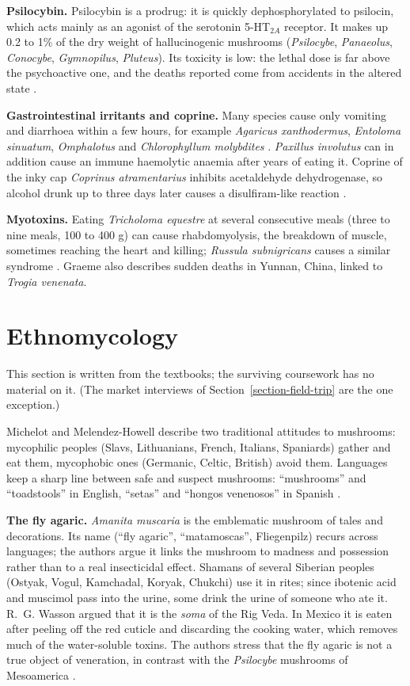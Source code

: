 \textbf{Psilocybin.}
Psilocybin is a prodrug: it is quickly
dephosphorylated to psilocin, which acts
mainly as an agonist of the serotonin
5-HT$_{2A}$ receptor. It makes
up 0.2 to 1\% of the dry weight of
hallucinogenic mushrooms (\emph{Psilocybe},
\emph{Panaeolus}, \emph{Conocybe},
\emph{Gymnopilus}, \emph{Pluteus}). Its
toxicity is low: the lethal dose is far above
the psychoactive one, and the deaths reported
come from accidents in the altered state
\cite{tyls2014psilocybin}.

\textbf{Gastrointestinal irritants and
coprine.}
Many species cause only vomiting and
diarrhoea within a few hours, for example
\emph{Agaricus xanthodermus}, \emph{Entoloma
sinuatum}, \emph{Omphalotus} and
\emph{Chlorophyllum molybdites}
\cite[pp.~110--113]{hall2003edible}.
\emph{Paxillus involutus} can in addition
cause an immune haemolytic anaemia after
years of eating it. Coprine of the inky cap
\emph{Coprinus atramentarius} inhibits
acetaldehyde dehydrogenase, so alcohol drunk
up to three days later causes a
disulfiram-like reaction
\cite{graeme2014mycetism}.

\textbf{Myotoxins.}
Eating \emph{Tricholoma equestre} at several
consecutive meals (three to nine meals, 100
to 400 g) can cause rhabdomyolysis, the
breakdown of muscle, sometimes reaching the
heart and killing; \emph{Russula
subnigricans} causes a similar syndrome
\cite{graeme2014mycetism}. Graeme also
describes sudden deaths in Yunnan, China,
linked to \emph{Trogia venenata}.

\section{Ethnomycology}
\label{section-ethnomycology}

This section is written from the textbooks;
the surviving coursework has no material on
it. (The market interviews of
Section~\ref{section-field-trip} are the one
exception.)

Michelot and Melendez-Howell describe two
traditional attitudes to mushrooms:
mycophilic peoples (Slavs, Lithuanians,
French, Italians, Spaniards) gather and eat
them, mycophobic ones (Germanic, Celtic,
British) avoid them. Languages keep a sharp
line between safe and suspect mushrooms:
``mushrooms'' and ``toadstools'' in English,
``setas'' and ``hongos venenosos'' in Spanish
\cite{michelot2003amanita}.

\textbf{The fly agaric.}
\emph{Amanita muscaria} is the emblematic
mushroom of tales and decorations. Its name
(``fly agaric'', ``matamoscas'', Fliegenpilz)
recurs across languages; the authors argue it
links the mushroom to madness and possession
rather than to a real insecticidal effect.
Shamans of several Siberian peoples (Ostyak,
Vogul, Kamchadal, Koryak, Chukchi) use it in
rites; since ibotenic acid and muscimol pass
into the urine, some drink the urine of
someone who ate it. R.~G. Wasson argued that
it is the \emph{soma} of the Rig Veda. In
Mexico it is eaten after peeling off the red
cuticle and discarding the cooking water,
which removes much of the water-soluble
toxins. The authors stress that the fly
agaric is not a true object of veneration,
in contrast with the \emph{Psilocybe}
mushrooms of Mesoamerica
\cite{michelot2003amanita}.

